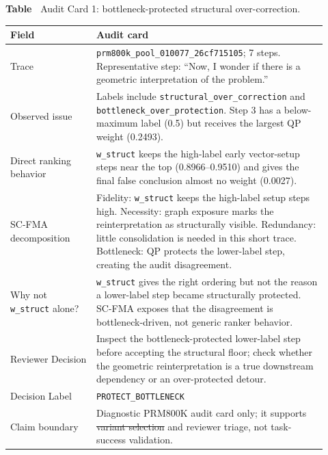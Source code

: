 \documentclass[a4paper,fleqn]{cas-sc}
\makeatletter
\newcommand{\variantSelection}{variant selection} %
\providecommand{\DIFaddtex}[1]{{\protect\color{blue}\uwave{#1}}} %
\providecommand{\DIFdeltex}[1]{{\protect\color{red}\sout{#1}}} %
\providecommand{\DIFaddbegin}{} %
\providecommand{\DIFaddend}{} %
\providecommand{\DIFdelbegin}{} %
\providecommand{\DIFdelend}{} %
\providecommand{\DIFadd}[1]{\texorpdfstring{\DIFaddtex{#1}}{#1}} %
\providecommand{\DIFdel}[1]{\texorpdfstring{\DIFdeltex{#1}}{}} %
\providecommand{\DIFscaledelfig}{0.5}
\newlength{\DIFdelgraphicswidth} %
\newlength{\DIFdelgraphicsheight} %
\providecommand{\DIFaddincludegraphics}[2][]{{\color{blue}\fbox{\DIFOincludegraphics[#1]{#2}}}} %
\providecommand{\DIFdelincludegraphics}[2][]{%
\sbox{\DIFdelgraphicsbox}{\DIFOincludegraphics[#1]{#2}}%
\settoboxwidth{\DIFdelgraphicswidth}{\DIFdelgraphicsbox} %
\settoboxtotalheight{\DIFdelgraphicsheight}{\DIFdelgraphicsbox} %
\scalebox{\DIFscaledelfig}{%
\parbox[b]{\DIFdelgraphicswidth}{\usebox{\DIFdelgraphicsbox}\\[-\baselineskip] \rule{\DIFdelgraphicswidth}{0em}}\llap{\resizebox{\DIFdelgraphicswidth}{\DIFdelgraphicsheight}{%
\setlength{\unitlength}{\DIFdelgraphicswidth}%
\begin{picture}(1,1)%
\thicklines\linethickness{2pt} %
{\color[rgb]{1,0,0}\put(0,0){\framebox(1,1){}}}%
{\color[rgb]{1,0,0}\put(0,0){\line( 1,1){1}}}%
{\color[rgb]{1,0,0}\put(0,1){\line(1,-1){1}}}%
\end{picture}%
}\hspace*{3pt}}} %
} %
\DeclareRobustCommand{\DIFaddbegin}{\DIFOaddbegin \let\includegraphics\DIFaddincludegraphics} %
\DeclareRobustCommand{\DIFaddend}{\DIFOaddend \let\includegraphics\DIFOincludegraphics} %
\DeclareRobustCommand{\DIFdelbegin}{\DIFOdelbegin \let\includegraphics\DIFdelincludegraphics} %
\DeclareRobustCommand{\DIFdelend}{\DIFOaddend \let\includegraphics\DIFOincludegraphics} %
\let\sout@orig\sout %
\renewcommand{\sout}[1]{\ifmmode\text{\sout@orig{\ensuremath{#1}}}\else\sout@orig{#1}\fi} %
\makeatother
\begin{document}
\par\medskip
{}\label{tab:audit-card-geometric}
\noindent\textbf{Table~\thetable\DIFaddbegin \DIFadd{:}\DIFaddend } \DIFdelbegin %
\DIFdelend Audit Card 1: bottleneck-protected structural over-correction.
\begin{center}
\small
\renewcommand{\arraystretch}{1.08}
\begin{tabular}{p{0.25\linewidth}p{0.67\linewidth}}
\toprule
\textbf{Field} & \textbf{Audit card} \\
\midrule
Trace & \texttt{prm800k\_pool\_010077\_26cf715105}; 7 steps. Representative step: ``Now, I wonder if there is a geometric interpretation of the problem.'' \\
Observed issue & Labels include \texttt{structural\_over\_correction} and \texttt{bottleneck\_over\_protection}. Step 3 has a below-maximum label (0.5) but receives the largest QP weight (0.2493). \\
Direct ranking behavior & \texttt{w\_struct} keeps the high-label early vector-setup steps near the top (0.8966--0.9510) and gives the final false conclusion almost no weight (0.0027). \\
SC-FMA decomposition & Fidelity: \texttt{w\_struct} keeps the high-label setup steps high. Necessity: graph exposure marks the reinterpretation as structurally visible. Redundancy: little consolidation is needed in this short trace. Bottleneck: QP protects the lower-label step, creating the audit disagreement. \\
Why not \texttt{w\_struct} alone? & \texttt{w\_struct} gives the right ordering but not the reason a lower-label step became structurally protected. SC-FMA exposes that the disagreement is bottleneck-driven, not generic ranker behavior. \\
Reviewer Decision & Inspect the bottleneck-protected lower-label step before accepting the structural floor; check whether the geometric reinterpretation is a true downstream dependency or an over-protected detour. \\
Decision Label & \texttt{PROTECT\_BOTTLENECK} \\
Claim boundary & Diagnostic PRM800K audit card only; it supports \DIFdelbegin \DIFdel{variant selection }\DIFdelend \DIFaddbegin \DIFadd{\variantSelection{} }\DIFaddend and reviewer triage, not task-success validation. \\
\bottomrule
\end{tabular}
\end{center}
\medskip
\end{document}
